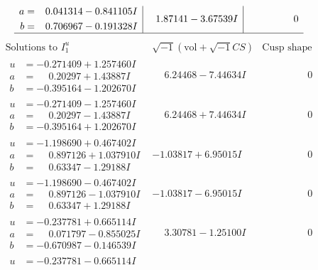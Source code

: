 \documentclass[1p]{elsarticle_modified}
\theoremstyle{definition}
\newcommand{\I}{\sqrt{-1}}
\begin{document}
$$\begin{array}{c|c|c}
\begin{aligned}
a &= \phantom{-}0.041314 - 0.841105 I \\
b &= \phantom{-}0.706967 - 0.191328 I\end{aligned}
 & \phantom{-}1.87141 - 3.67539 I & \phantom{-0.000000 } 0\\
 \hline 
 \end{array}$$\newpage$$\begin{array}{c|c|c}  
\text{Solutions to }I^u_{1}& \I (\text{vol} + \sqrt{-1}CS) & \text{Cusp shape}\\
 \hline 
\begin{aligned}
u &= -0.271409 + 1.257460 I \\
a &= \phantom{-}0.20297 + 1.43887 I \\
b &= -0.395164 - 1.202670 I\end{aligned}
 & \phantom{-}6.24468 - 7.44634 I & \phantom{-0.000000 } 0 \\ \hline\begin{aligned}
u &= -0.271409 - 1.257460 I \\
a &= \phantom{-}0.20297 - 1.43887 I \\
b &= -0.395164 + 1.202670 I\end{aligned}
 & \phantom{-}6.24468 + 7.44634 I & \phantom{-0.000000 } 0 \\ \hline\begin{aligned}
u &= -1.198690 + 0.467402 I \\
a &= \phantom{-}0.897126 + 1.037910 I \\
b &= \phantom{-}0.63347 - 1.29188 I\end{aligned}
 & -1.03817 + 6.95015 I & \phantom{-0.000000 } 0 \\ \hline\begin{aligned}
u &= -1.198690 - 0.467402 I \\
a &= \phantom{-}0.897126 - 1.037910 I \\
b &= \phantom{-}0.63347 + 1.29188 I\end{aligned}
 & -1.03817 - 6.95015 I & \phantom{-0.000000 } 0 \\ \hline\begin{aligned}
u &= -0.237781 + 0.665114 I \\
a &= \phantom{-}0.071797 - 0.855025 I \\
b &= -0.670987 - 0.146539 I\end{aligned}
 & \phantom{-}3.30781 - 1.25100 I & \phantom{-0.000000 } 0 \\ \hline\begin{aligned}
u &= -0.237781 - 0.665114 I \\

\end{aligned}
\end{array}$$
\end{document}
